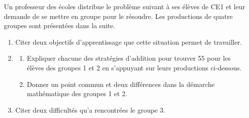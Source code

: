 \begin{exercice}[CRPE 2018 G3]
Un professeur des écoles distribue le problème suivant à ses élèves de CE1 et leur demande de se mettre en groupe pour le résoudre. Les productions de quatre groupes sont présentées dans la suite.
\begin{center}
\end{center}
\begin{enumerate}
   \item Citer deux objectifs d’apprentissage que cette situation permet de travailler.
   \item
   \begin{enumerate}
      \item Expliquer chacune des stratégies d’addition pour trouver 55 pour les élèves des groupes 1 et 2 en s’appuyant sur leurs productions ci-dessous.
      \item Donner un point commun et deux différences dans la démarche mathématique des groupes 1 et 2.
   \end{enumerate}
   \item Citer deux difficultés qu’a rencontrées le groupe 3.
\end{enumerate}
\end{exercice}



